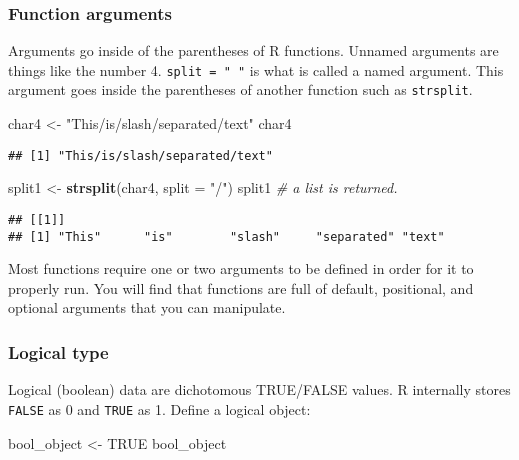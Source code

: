 \documentclass[]{article}
\newenvironment{Shaded}{\begin{snugshade}}{\end{snugshade}}
\newcommand{\KeywordTok}[1]{\textcolor[rgb]{0.13,0.29,0.53}{\textbf{#1}}}
\newcommand{\DataTypeTok}[1]{\textcolor[rgb]{0.13,0.29,0.53}{#1}}
\newcommand{\StringTok}[1]{\textcolor[rgb]{0.31,0.60,0.02}{#1}}
\newcommand{\CommentTok}[1]{\textcolor[rgb]{0.56,0.35,0.01}{\textit{#1}}}
\newcommand{\OtherTok}[1]{\textcolor[rgb]{0.56,0.35,0.01}{#1}}
\newcommand{\NormalTok}[1]{#1}
\begin{document}
\subsubsection{Function arguments}\label{function-arguments}

Arguments go inside of the parentheses of R functions. Unnamed arguments
are things like the number 4. \texttt{split\ =\ "\ "} is what is called
a named argument. This argument goes inside the parentheses of another
function such as \texttt{strsplit}.

\begin{Shaded}
\begin{Highlighting}[]
\NormalTok{char4 <-}\StringTok{ "This/is/slash/separated/text"}
\NormalTok{char4}
\end{Highlighting}
\end{Shaded}

\begin{verbatim}
## [1] "This/is/slash/separated/text"
\end{verbatim}

\begin{Shaded}
\begin{Highlighting}[]
\NormalTok{split1 <-}\StringTok{ }\KeywordTok{strsplit}\NormalTok{(char4, }\DataTypeTok{split =} \StringTok{"/"}\NormalTok{)}
\NormalTok{split1 }\CommentTok{# a list is returned. }
\end{Highlighting}
\end{Shaded}

\begin{verbatim}
## [[1]]
## [1] "This"      "is"        "slash"     "separated" "text"
\end{verbatim}

Most functions require one or two arguments to be defined in order for
it to properly run. You will find that functions are full of default,
positional, and optional arguments that you can manipulate.

\subsubsection{Logical type}\label{logical-type}

Logical (boolean) data are dichotomous TRUE/FALSE values. R internally
stores \texttt{FALSE} as 0 and \texttt{TRUE} as 1. Define a logical
object:

\begin{Shaded}
\begin{Highlighting}[]
\NormalTok{bool_object <-}\StringTok{ }\OtherTok{TRUE}
\NormalTok{bool_object}
\end{Highlighting}
\end{Shaded}
\end{document}
